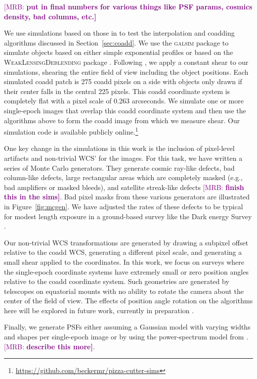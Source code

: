 \documentclass[twocolappendix, appendixfloats, numberedappendix, twocolumn, apj]{openjournal}
\newcommand{\mrb}[1]{\textcolor{purple}{[MRB: \bf #1]}\xspace}
\newcommand{\galsim}{\textsc{galsim}\xspace}
\newcommand{\descwl}{\textsc{WeakLensingDeblending}\xspace}
\begin{document}
\mrb{put in final numbers for various things like PSF params, cosmics density, bad columns, etc.}

We use simulations based on those in \citet{mdet} to test the interpolation and coadding algorithms
discussed in Section~\ref{sec:coadd}. We use the \galsim package \citep{GALSIM2015} to simulate
objects based on either simple exponential profiles or based on the \descwl package
\citep{WeakLensingDeblendingPaper,WeakLensingDeblendingSoftware}. Following \citet{mdet}, we apply a constant shear
to our simulations, shearing the entire field of view including the object positions. Each simulated coadd patch is
275 coadd pixels on a side with objects only drawn if their center falls in the central 225 pixels. This coadd coordinate
system is completely flat with a pixel scale of 0.263 arcseconds. We simulate one or more single-epoch images that overlap this
coadd coordinate system and then use the algorithms above to form the coadd image from which we measure shear.
Our simulation code is available publicly online.\footnote{\url{https://github.com/beckermr/pizza-cutter-sims}}

One key change in the simulations in this work is the inclusion of pixel-level artifacts and non-trivial
WCS' for the images. For this task, we have written a series of Monte Carlo generators. They generate
cosmic ray-like defects, bad column-like defects, large rectangular areas which are completely masked (e.g.,
bad amplifiers or masked bleeds), and satellite streak-like defects \mrb{finish this in the sims}. Bad pixel
masks from these various generators are illustrated in Figure~\ref{fig:mcgen}. We have adjusted the rates
of these defects to be typical for modest length exposure in a ground-based survey like the Dark energy Survey
\citep{des}.

Our non-trivial WCS transformations are generated by drawing a subpixel offset relative to the coadd WCS,
generating a different pixel scale, and generating a small shear applied to the coordinates. In this work, we focus on
surveys where the single-epoch coordinate systems have extremely small or zero position angles relative to the
coadd coordinate system. Such geometries are generated by telescopes on equatorial mounts with no ability to rotate the
camera about the center of the field of view. The effects of position angle rotation on the algorithms
here will be explored in future work, currently in preparation \citep{sheldoninprep}.

Finally, we generate PSFs either assuming a Gaussian model with varying widths and shapes
per single-epoch image or by using the power-spectrum model from \citep{mdet}. \mrb{describe this more}.
\end{document}
